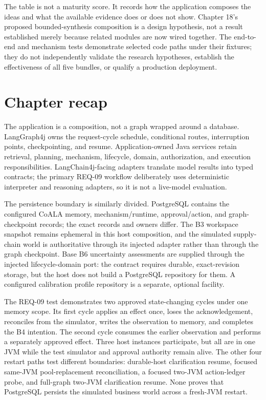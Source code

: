 The table is not a maturity score. It records how the application composes the ideas and what the available evidence does or does not show. Chapter 18's proposed bounded-synthesis composition is a design hypothesis, not a result established merely because related modules are now wired together. The end-to-end and mechanism tests demonstrate selected code paths under their fixtures; they do not independently validate the research hypotheses, establish the effectiveness of all five bundles, or qualify a production deployment.

\section{Chapter recap}
\label{sec:ch24-recap}

\begin{chapterrecap}
The application is a composition, not a graph wrapped around a database. LangGraph4j owns the request-cycle schedule, conditional routes, interruption points, checkpointing, and resume. Application-owned Java services retain retrieval, planning, mechanism, lifecycle, domain, authorization, and execution responsibilities. LangChain4j-facing adapters translate model results into typed contracts; the primary REQ-09 workflow deliberately uses deterministic interpreter and reasoning adapters, so it is not a live-model evaluation.

The persistence boundary is similarly divided. PostgreSQL contains the configured CoALA memory, mechanism/runtime, approval/action, and graph-checkpoint records; the exact records and owners differ. The B3 workspace snapshot remains ephemeral in this host composition, and the simulated supply-chain world is authoritative through its injected adapter rather than through the graph checkpoint. Base B6 uncertainty assessments are supplied through the injected lifecycle-domain port: the contract requires durable, exact-revision storage, but the host does not build a PostgreSQL repository for them. A configured calibration profile repository is a separate, optional facility.

The REQ-09 test demonstrates two approved state-changing cycles under one memory scope. Its first cycle applies an effect once, loses the acknowledgement, reconciles from the simulator, writes the observation to memory, and completes the B4 intention. The second cycle consumes the earlier observation and performs a separately approved effect. Three host instances participate, but all are in one JVM while the test simulator and approval authority remain alive. The other four restart paths test different boundaries: durable-host clarification resume, focused same-JVM pool-replacement reconciliation, a focused two-JVM action-ledger probe, and full-graph two-JVM clarification resume. None proves that PostgreSQL persists the simulated business world across a fresh-JVM restart.
\end{chapterrecap}

